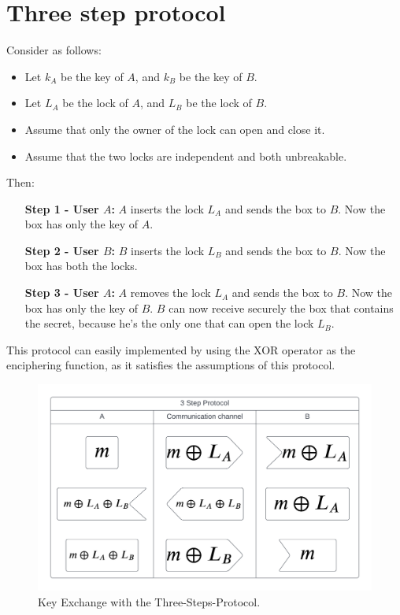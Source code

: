 \section{Three step protocol}
\begin{definition}
    Consider as follows:
    \begin{itemize}
        \item Let $k_{A}$ be the key of $A$, and $k_{B}$ be the key of $B$.
        \item Let $L_{A}$ be the lock of $A$, and $L_{B}$ be the lock of $B$.
        \item Assume that only the owner of the lock can open and close it.
        \item Assume that the two locks are independent and both unbreakable.
    \end{itemize}
    Then:
    \begin{itemize}
        \item[\textbf{Step 1 - User $A$:}] $A$ inserts the lock $L_{A}$ and sends the box to $B$. Now the box has only the key of $A$.
        \item[\textbf{Step 2 - User $B$:}] $B$ inserts the lock $L_{B}$ and sends the box to $B$. Now the box has both the locks.
        \item[\textbf{Step 3 - User $A$:}] $A$ removes the lock $L_{A}$ and sends the box to $B$. Now the box has only the key of $B$. $B$ can now receive securely the box that contains the secret, because he's the only one that can open the lock $L_{B}$.
    \end{itemize}
\end{definition}
This protocol can easily implemented by using the XOR operator as the enciphering function, as it satisfies the assumptions of this protocol.
\begin{figure}[h]
    \centering
    \includegraphics[width=\textwidth]{img/KeyExc_3SP.png}
    \caption{Key Exchange with the Three-Steps-Protocol.}
\end{figure}

